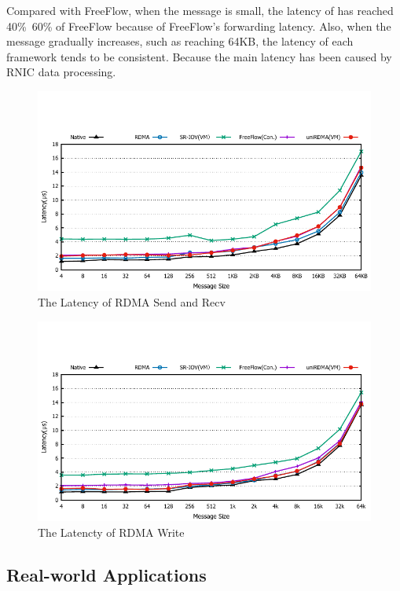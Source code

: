Compared with FreeFlow, when the message is small, the latency of \sys has reached 40\%~60\% of FreeFlow because of FreeFlow's forwarding latency. Also, when the message gradually increases, such as reaching 64KB, the latency of each framework tends to be consistent. Because the main latency has been caused by RNIC data processing.

\begin{figure}[!ht]
	\centering
	\includegraphics[width=1.0\linewidth]{images/send-lat.pdf}
	\caption{The Latency of RDMA Send and Recv}
	\label{fig:send-lat}
\end{figure}

\begin{figure}[!ht]
	\centering
	\includegraphics[width=1.0\linewidth]{images/write-lat.pdf}
	\caption{The Latencty of RDMA Write}
	\label{fig:write-lat}
\end{figure}

\subsection{Real-world Applications}

